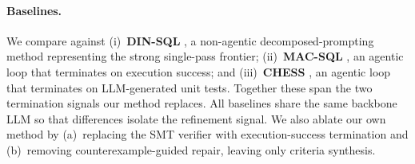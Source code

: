 \documentclass{article}
\begin{document}
\paragraph{Baselines.} We compare against (i)~\textbf{DIN-SQL}
\cite{pourreza2023dinsql}, a non-agentic decomposed-prompting method representing
the strong single-pass frontier; (ii)~\textbf{MAC-SQL} \cite{wang2023macsql}, an
agentic loop that terminates on execution success; and (iii)~\textbf{CHESS}
\cite{talaei2024chess}, an agentic loop that terminates on LLM-generated unit
tests. Together these span the two termination signals our method replaces. All
baselines share the same backbone LLM so that differences isolate the refinement
signal. We also ablate our own method by (a)~replacing the SMT verifier with
execution-success termination and (b)~removing counterexample-guided repair,
leaving only criteria synthesis.



\end{document}
